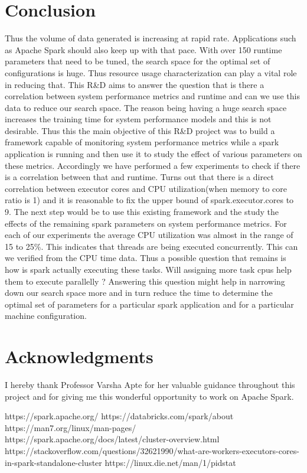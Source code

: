 \documentclass[11pt]{article}
\begin{document}
\section{Conclusion}
Thus the volume of data generated is increasing at rapid rate. Applications such as Apache Spark should also keep up with that pace. With over 150 runtime parameters that need to be tuned, the search space for the optimal set of configurations is huge. Thus resource usage characterization can play a vital role in reducing that. This R\&D aims to answer the question that is there a correlation between system performance metrics and runtime and can we use this data to reduce our search space. The reason being having a huge search space increases the training time for system performance models and this is not desirable. Thus this the main objective of this R\&D project was to build a framework capable of monitoring system performance metrics while a spark application is running and then use it to study the effect of various parameters on these metrics. Accordingly we have performed a few experiments to check if there is a correlation between that and runtime. Turns out that there is a direct correlation between executor cores and CPU utilization(when memory to core ratio is 1) and it is reasonable to fix the upper bound of spark.executor.cores to 9. The next step would be to use this existing framework and the study the effects of the remaining spark parameters on system performance metrics. For each of our experiments the average CPU utilization was almost in the range of 15 to 25\%. This indicates that threads are being executed concurrently. This can we verified from the CPU time data. Thus a possible question that remains is how is spark actually executing these tasks. Will assigning more task cpus help them to execute parallelly ? Answering this question might help in narrowing down our search space more and in turn reduce the time to determine the optimal set of parameters for a particular spark application and for a particular machine configuration.

\section{Acknowledgments}
I hereby thank Professor Varsha Apte for her valuable guidance throughout this project and for giving me this wonderful opportunity to work on Apache Spark.
\newpage
\begin{thebibliography}{}

 https://spark.apache.org/
https://databricks.com/spark/about
https://man7.org/linux/man-pages/
https://spark.apache.org/docs/latest/cluster-overview.html
https://stackoverflow.com/questions/32621990/what-are-workers-executors-cores-in-spark-standalone-cluster
https://linux.die.net/man/1/pidstat
\end{thebibliography}
\end{document}
